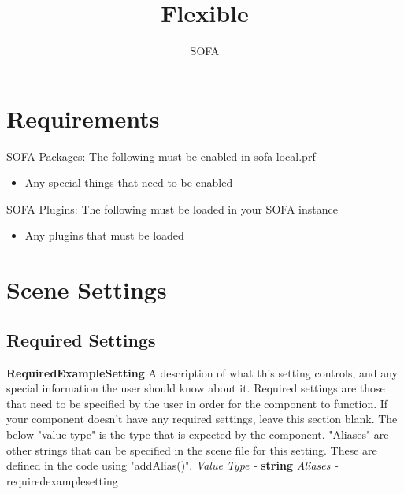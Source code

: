 \documentclass[a4paper,11pt]{article}
\newenvironment{componentoption}[1]%
{\textbf{#1}\newline}
{\newline}
\newcommand{\aliases}[1] {\newline \textit{Aliases - } #1}
\newcommand{\valuetype}[1] {\newline \textit{Value Type - } \textbf{#1}}
\begin{document}
\raggedright

\title{Flexible}
\author{SOFA}

\maketitle

\begin{abstract}

\end{abstract}




\section{Requirements}

SOFA Packages:
The following must be enabled in sofa-local.prf
\begin{itemize}
\item Any special things that need to be enabled
\end{itemize}

SOFA Plugins:
The following must be loaded in your SOFA instance
\begin{itemize}
\item Any plugins that must be loaded
\end{itemize}

\section{Scene Settings}

\subsection{Required Settings}

\begin{componentoption}{RequiredExampleSetting}
A description of what this setting controls, and any special information the user should know about it. Required settings are those that need to be specified by the user in order for the component to function. If your component doesn't have any required settings, leave this section blank. The below "value type" is the type that is expected by the component. "Aliases" are other strings that can be specified in the scene file for this setting. These are defined in the code using "addAlias()".
\valuetype{string}
\aliases{requiredexamplesetting}
\end{componentoption}
\end{document}
